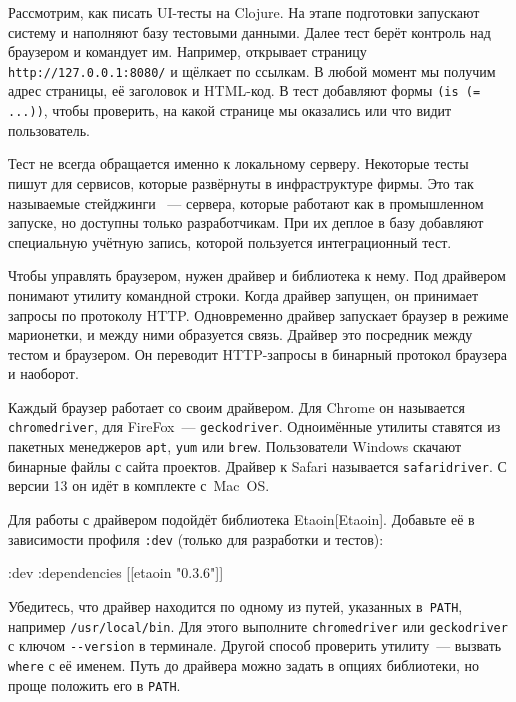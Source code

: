 Рассмотрим, как писать UI-тесты на Clojure. На этапе подготовки запускают
систему и наполняют базу тестовыми данными. Далее тест берёт контроль над
браузером и командует им. Например, открывает страницу \verb|http://127.0.0.1:8080/|
и щёлкает по ссылкам. В любой момент мы получим адрес страницы, её заголовок
и HTML-код. В тест добавляют формы \verb|(is (= ...))|, чтобы проверить,
на какой странице мы оказались или что видит пользователь.

Тест не всегда обращается именно к локальному серверу. Некоторые тесты пишут для
сервисов, которые развёрнуты в инфраструктуре фирмы. Это так называемые
стейджинги ~--- сервера, которые работают как в промышленном
запуске, но доступны только разработчикам. При их деплое в базу добавляют
специальную учётную запись, которой пользуется интеграционный тест.


Чтобы управлять браузером, нужен драйвер и библиотека к нему. Под драйвером
понимают утилиту командной строки. Когда драйвер запущен, он принимает запросы
по протоколу HTTP. Одновременно драйвер запускает браузер в режиме марионетки, и
между ними образуется связь. Драйвер это посредник между тестом и браузером. Он
переводит HTTP-запросы в бинарный протокол браузера и наоборот.


Каждый браузер работает со своим драйвером. Для Chrome он называется
\verb|chromedriver|, для FireFox~--- \verb|geckodriver|. Одноимённые утилиты
ставятся из пакетных менеджеров \verb|apt|, \verb|yum| или
\verb|brew|. Пользователи Windows скачают бинарные файлы с сайта
проектов. Драйвер к Safari называется \verb|safaridriver|. С версии 13 он
идёт в комплекте с~Mac~OS.


Для работы с драйвером подойдёт библиотека Etaoin[Etaoin].
Добавьте её в зависимости профиля \verb|:dev| (только для разработки и тестов):

\begin{english}
  \begin{clojure}
:dev {:dependencies [[etaoin "0.3.6"]]}
  \end{clojure}
\end{english}

Убедитесь, что драйвер находится по одному из путей, указанных в~\verb|PATH|,
например \verb|/usr/local/bin|. Для этого выполните \verb|chromedriver| или
\verb|geckodriver| с ключом \verb|--version| в терминале. Другой способ
проверить утилиту~--- вызвать \verb|where| с её именем. Путь до драйвера можно
задать в опциях библиотеки, но проще положить его в \verb|PATH|.

